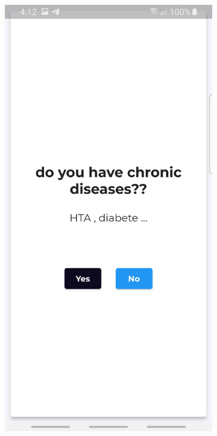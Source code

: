 \begin{figure}
\begin{subfigure}{.31\textwidth}
  \label{fig:sub-first}
\end{subfigure}
\begin{subfigure}{.31\textwidth}
  \centering
  \includegraphics[width=1\linewidth]{images1/quess2.jpg}  

\end{subfigure}
\end{figure}
